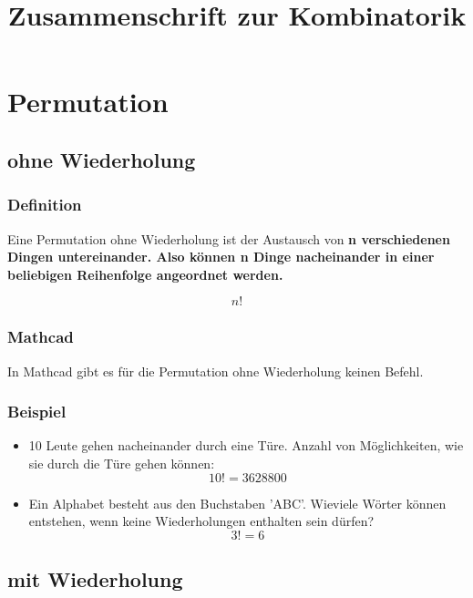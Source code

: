 \documentclass[a4paper,10pt]{article}
\title{Zusammenschrift zur Kombinatorik}
\begin{document}
\maketitle
\thispagestyle{fancy}

\section{Permutation}
\subsection{ohne Wiederholung}
\subsubsection{Definition}
Eine Permutation ohne Wiederholung ist der Austausch von \bf{n}
verschiedenen Dingen untereinander. Also können \bf{n} Dinge nacheinander
in einer beliebigen Reihenfolge angeordnet werden.

\begin{equation}
  \label{eq:1}
  n!
\end{equation}

\subsubsection{Mathcad}
In Mathcad gibt es für die Permutation ohne Wiederholung keinen Befehl.

\subsubsection{Beispiel}
\begin{itemize}
\item {
    10 Leute gehen nacheinander durch eine Türe. Anzahl von Möglichkeiten,
    wie sie durch die Türe gehen können:
    \begin{equation}
      \label{eq:3}
      10! = 3628800
    \end{equation}
  }
\item {
    Ein Alphabet besteht aus den Buchstaben 'ABC'. Wieviele Wörter
    können entstehen, wenn keine Wiederholungen enthalten sein dürfen?
    \begin{equation}
      \label{eq:4}
      3! = 6
    \end{equation}
  }
\end{itemize}

\subsection{mit Wiederholung}
\end{document}
